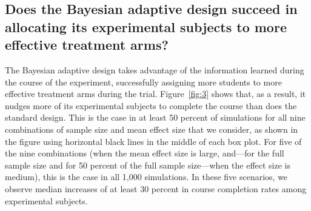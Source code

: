 \documentclass{acm_proc_article-sp}
\begin{document}
\subsection{Does the Bayesian adaptive design succeed in allocating its experimental subjects to more effective treatment arms?}
The Bayesian adaptive design takes advantage of the information learned during the course of the experiment, successfully assigning more students to more effective treatment arms during the trial. Figure~\ref{fig:3} shows that, as a result, it nudges more of its experimental subjects to complete the course than does the standard design. This is the case in at least 50 percent of simulations for all nine combinations of sample size and mean effect size that we consider, as shown in the figure using horizontal black lines in the middle of each box plot. For five of the nine combinations (when the mean effect size is large, and---for the full sample size and for 50 percent of the full sample size---when the effect size is medium), this is the case in all 1,000 simulations. In these five scenarios, we observe median increases of at least 30 percent in course completion rates among experimental subjects. 
\end{document}

